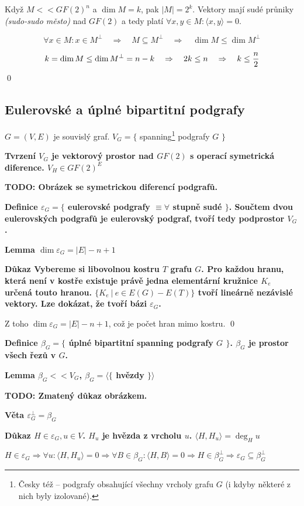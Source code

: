 \documentclass[a4paper,12pt,titlepage]{article}
\newcommand{\lm}{\smallskip\noindent\bf Lemma\rm{} }
\newcommand{\dk}{\smallskip\noindent\bf Důkaz\rm{} }
\newcommand{\df}{\smallskip\noindent\bf Definice\rm{} }
\newcommand{\vt}{\smallskip\noindent\bf Věta\rm{} }
\newcommand{\tvr}{\smallskip\noindent\bf Tvrzení\rm{} }
\newcommand{\todo}[1]{\bf TODO: \rm#1}
\newcommand{\sk}[1]{\langle #1\rangle}
\begin{document}
Když $M << GF(2)^n$ a $\dim M = k$, pak $|M| = 2^k$. Vektory mají sudé průniky {\it (sudo-sudo město)} nad $GF(2)$ a tedy platí $\forall x,y\in M: \sk{x,y} = 0$.

$$\forall x\in M: x\in M^\bot \quad\Rightarrow\quad M\subseteq M^\bot \quad\Rightarrow\quad \dim M \le \dim M^\bot$$

$$k = \dim M \le \dim M^\bot = n-k \quad\Rightarrow\quad 2k \le n \quad\Rightarrow\quad k \le {n\over 2}$$
\qed

\subsection{Eulerovské a úplné bipartitní podgrafy}

$G = (V,E)$ je souvislý graf. $V_G = \{$ spanning\footnote{Česky též  -- podgrafy obsahující všechny vrcholy grafu $G$ (i kdyby některé z nich byly izolované).} podgrafy $G$ $\}$

\tvr $V_G$ je vektorový prostor nad $GF(2)$ s operací symetrická diference. $V_H \in GF(2)^E$

\bigskip
\todo Obrázek se symetrickou diferencí podgrafů.
\bigskip

\df $\varepsilon_G = \{ $ eulerovské podgrafy $\equiv
\forall $ stupně sudé $ \}$. Součtem dvou eulerovských podgrafů je eulerovský
podgraf, tvoří tedy podprostor $V_G$.

\lm $\dim \varepsilon_G = |E| - n + 1$

\dk Vybereme si libovolnou kostru $T$ grafu $G$. Pro každou hranu, která není v
kostře existuje právě jedna elementární kružnice $K_e$ určená touto hranou. $\{
K_e\ |\ e \in E(G) - E(T) \}$ tvoří lineárně nezávislé vektory. Lze dokázat,
že tvoří bázi $\varepsilon_G$.

Z toho $\dim \varepsilon_G = |E| - n + 1$, což je počet hran mimo kostru. \qed

\df $\beta_G = \{$ úplné bipartitní spanning podgrafy $G$ $\}$. $\beta_G$ je
prostor všech řezů v $G$.

\lm $\beta_G << V_G$, $\beta_G = \langle\{$ hvězdy $\}\rangle$

\bigskip
\todo Zmatený důkaz obrázkem.
\bigskip


\vt $\varepsilon_G^\bot = \beta_G$

\dk $H \in \varepsilon_G, u \in V$. $H_u$ je hvězda z vrcholu $u$. $\sk{H,H_u} = \deg_H u$

$H \in \varepsilon_G \Rightarrow \forall u: \sk{H,H_u} = 0 \Rightarrow \forall B\in \beta_G: \sk{H,B} = 0 \Rightarrow H \in \beta_G^\bot \Rightarrow \varepsilon_G \subseteq \beta_G^\bot$
\end{document}
